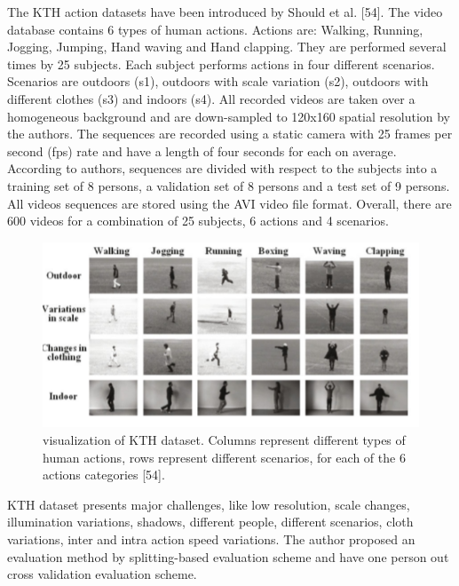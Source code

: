 The KTH action datasets have been introduced by Should et al. [54]. The video database contains 6 types of human actions. Actions are: Walking, Running, Jogging, Jumping, Hand waving and Hand clapping. They are performed several times by 25 subjects. Each subject performs actions in four different scenarios. Scenarios are outdoors (s1), outdoors with scale variation (s2), outdoors with different clothes (s3) and indoors (s4). All recorded videos are taken over a homogeneous background and are down-sampled to 120x160 spatial resolution by the authors. The sequences are recorded using a static camera with 25 frames per second (fps) rate and have a length of four seconds for each on average. According to authors, sequences are divided with respect to the subjects into a training set of 8 persons, a validation set of 8 persons and a test set of 9 persons. All videos sequences are stored using the AVI video file format. Overall, there are 600 videos for a combination of 25 subjects, 6 actions and 4 scenarios. 
\begin{figure}[ht]
\centering
\includegraphics{Figures/dt1}
\decoRule
\caption[visualization of KTH dataset. Columns represent different types of human actions, rows represent different scenarios, for each of the 6 actions categories "54"]{visualization of KTH dataset. Columns represent different types of human actions, rows represent different scenarios, for each of the 6 actions categories [54].}
\label{fig:la}
\end{figure}
KTH dataset presents major challenges, like low resolution, scale changes, illumination variations, shadows, different people, different scenarios, cloth variations, inter and intra action speed variations. The author proposed an evaluation method by splitting-based evaluation scheme and have one person out cross validation evaluation scheme.\\

